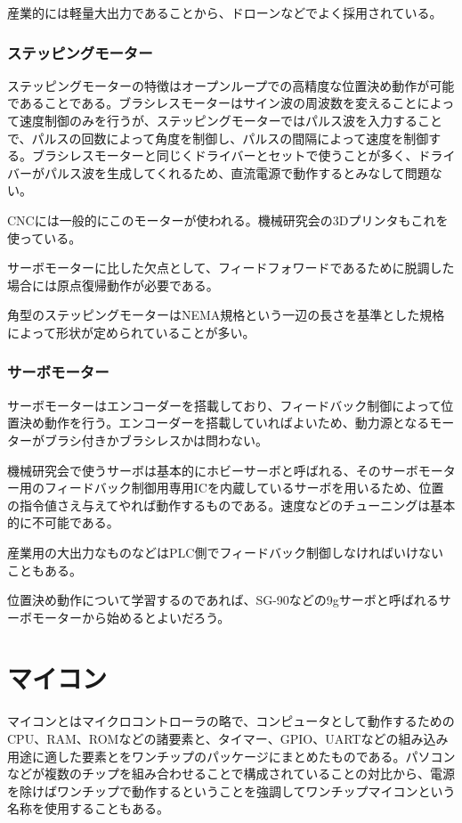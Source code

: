 \documentclass[a4paper,titlepage,here]{ujarticle}
\begin{document}
産業的には軽量大出力であることから、ドローンなどでよく採用されている。
\subsubsection{ステッピングモーター}
ステッピングモーターの特徴はオープンループでの高精度な位置決め動作が可能であることである。ブラシレスモーターはサイン波の周波数を変えることによって速度制御のみを行うが、ステッピングモーターではパルス波を入力することで、パルスの回数によって角度を制御し、パルスの間隔によって速度を制御する。ブラシレスモーターと同じくドライバーとセットで使うことが多く、ドライバーがパルス波を生成してくれるため、直流電源で動作するとみなして問題ない。

CNCには一般的にこのモーターが使われる。機械研究会の3Dプリンタもこれを使っている。

サーボモーターに比した欠点として、フィードフォワードであるために脱調した場合には原点復帰動作が必要である。

角型のステッピングモーターはNEMA規格という一辺の長さを基準とした規格によって形状が定められていることが多い。
\subsubsection{サーボモーター}
サーボモーターはエンコーダーを搭載しており、フィードバック制御によって位置決め動作を行う。エンコーダーを搭載していればよいため、動力源となるモーターがブラシ付きかブラシレスかは問わない。

機械研究会で使うサーボは基本的にホビーサーボと呼ばれる、そのサーボモーター用のフィードバック制御用専用ICを内蔵しているサーボを用いるため、位置の指令値さえ与えてやれば動作するものである。速度などのチューニングは基本的に不可能である。

産業用の大出力なものなどはPLC側でフィードバック制御しなければいけないこともある。

位置決め動作について学習するのであれば、SG-90などの9gサーボと呼ばれるサーボモーターから始めるとよいだろう。
\section{マイコン}
マイコンとはマイクロコントローラの略で、コンピュータとして動作するためのCPU、RAM、ROMなどの諸要素と、タイマー、GPIO、UARTなどの組み込み用途に適した要素とをワンチップのパッケージにまとめたものである。パソコンなどが複数のチップを組み合わせることで構成されていることの対比から、電源を除けばワンチップで動作するということを強調してワンチップマイコンという名称を使用することもある。
\end{document}
